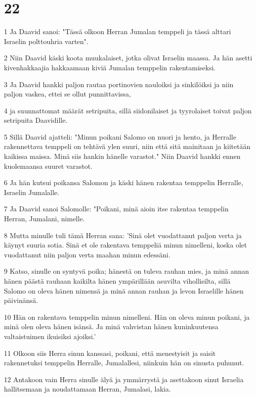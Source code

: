 \chapter{22}

\par 1 Ja Daavid sanoi: "Tässä olkoon Herran Jumalan temppeli ja tässä alttari Israelin polttouhria varten".
\par 2 Niin Daavid käski koota muukalaiset, jotka olivat Israelin maassa. Ja hän asetti kivenhakkaajia hakkaamaan kiviä Jumalan temppelin rakentamiseksi.
\par 3 Ja Daavid hankki paljon rautaa portinovien nauloiksi ja sinkilöiksi ja niin paljon vaskea, ettei se ollut punnittavissa,
\par 4 ja suunnattomat määrät setripuita, sillä siidonilaiset ja tyyrolaiset toivat paljon setripuita Daavidille.
\par 5 Sillä Daavid ajatteli: "Minun poikani Salomo on nuori ja hento, ja Herralle rakennettava temppeli on tehtävä ylen suuri, niin että sitä mainitaan ja kiitetään kaikissa maissa. Minä siis hankin hänelle varastot." Niin Daavid hankki ennen kuolemaansa suuret varastot.
\par 6 Ja hän kutsui poikansa Salomon ja käski hänen rakentaa temppelin Herralle, Israelin Jumalalle.
\par 7 Ja Daavid sanoi Salomolle: "Poikani, minä aioin itse rakentaa temppelin Herran, Jumalani, nimelle.
\par 8 Mutta minulle tuli tämä Herran sana: 'Sinä olet vuodattanut paljon verta ja käynyt suuria sotia. Sinä et ole rakentava temppeliä minun nimelleni, koska olet vuodattanut niin paljon verta maahan minun edessäni.
\par 9 Katso, sinulle on syntyvä poika; hänestä on tuleva rauhan mies, ja minä annan hänen päästä rauhaan kaikilta hänen ympärillään asuvilta vihollisilta, sillä Salomo on oleva hänen nimensä ja minä annan rauhan ja levon Israelille hänen päivinänsä.
\par 10 Hän on rakentava temppelin minun nimelleni. Hän on oleva minun poikani, ja minä olen oleva hänen isänsä. Ja minä vahvistan hänen kuninkuutensa valtaistuimen ikuisiksi ajoiksi.'
\par 11 Olkoon siis Herra sinun kanssasi, poikani, että menestyisit ja saisit rakennetuksi temppelin Herralle, Jumalallesi, niinkuin hän on sinusta puhunut.
\par 12 Antakoon vain Herra sinulle älyä ja ymmärrystä ja asettakoon sinut Israelia hallitsemaan ja noudattamaan Herran, Jumalasi, lakia.
